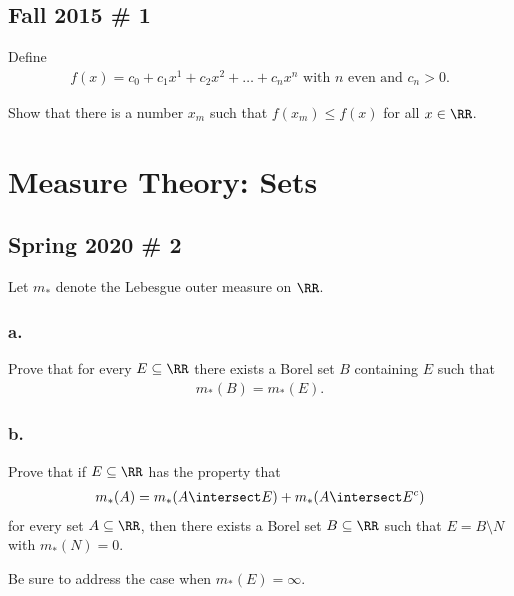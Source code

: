\hypertarget{fall-2015-1}{%
\subsection{Fall 2015 \# 1}\label{fall-2015-1}}

Define
\begin{align*}
f(x)=c_{0}+c_{1} x^{1}+c_{2} x^{2}+\ldots+c_{n} x^{n} \text { with } n \text { even and } c_{n}>0.
\end{align*}

Show that there is a number \(x_m\) such that \(f(x_m) \leq f(x)\) for
all \(x\in \RR\).

\hypertarget{measure-theory-sets}{%
\section{Measure Theory: Sets}\label{measure-theory-sets}}

\hypertarget{spring-2020-2}{%
\subsection{Spring 2020 \# 2}\label{spring-2020-2}}

Let \(m_*\) denote the Lebesgue outer measure on \(\RR\).

\hypertarget{a.}{%
\subsubsection{a.}\label{a.}}

Prove that for every \(E\subseteq \RR\) there exists a Borel set \(B\)
containing \(E\) such that
\begin{align*}
m_*(B) = m_*(E)
.\end{align*}

\hypertarget{b.}{%
\subsubsection{b.}\label{b.}}

Prove that if \(E\subseteq \RR\) has the property that
\begin{align*}
m_*(A) = m_*(A\intersect E) + m_*(A\intersect E^c)
\end{align*} for every set \(A\subseteq \RR\), then there exists a Borel
set \(B\subseteq \RR\) such that \(E = B\setminus N\) with
\(m_*(N) = 0\).

Be sure to address the case when \(m_*(E) = \infty\).

